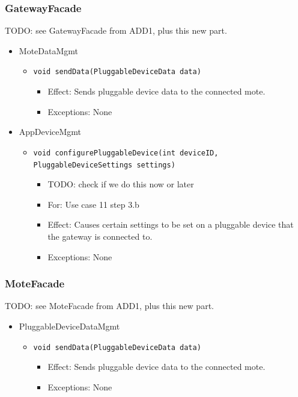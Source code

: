     \subsubsection{GatewayFacade}
        TODO: see GatewayFacade from ADD1, plus this new part.
        \begin{itemize}
            \item MoteDataMgmt
            \begin{itemize}
                \item \texttt{void sendData(PluggableDeviceData data)}
                \begin{itemize}
                    \item Effect: Sends pluggable device data to the connected mote.
                    \item Exceptions: None
                \end{itemize}
            \end{itemize}

            \item AppDeviceMgmt
            \begin{itemize}
                \item \texttt{void configurePluggableDevice(int deviceID, PluggableDeviceSettings settings)}
                \begin{itemize}
                    \item TODO: check if we do this now or later
                    \item For: Use case 11 step 3.b
                    \item Effect: Causes certain settings to be set on a pluggable
                          device that the gateway is connected to.
                    \item Exceptions: None
                \end{itemize}
            \end{itemize}
        \end{itemize}

    \subsubsection{MoteFacade}
        TODO: see MoteFacade from ADD1, plus this new part.
        \begin{itemize}
            \item PluggableDeviceDataMgmt
            \begin{itemize}
                \item \texttt{void sendData(PluggableDeviceData data)}
                \begin{itemize}
                    \item Effect: Sends pluggable device data to the connected mote.
                    \item Exceptions: None
                \end{itemize}
            \end{itemize}
        \end{itemize}

